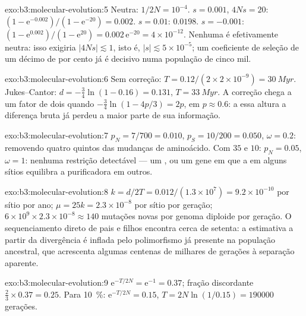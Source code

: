 \begin{solution}{exo:b3:molecular-evolution:5}
Neutra: $1/2N = 10^{-4}$. $s = 0.001$, $4Ns = 20$: $(1 - \mathrm{e}^{-0.002})/
(1 - \mathrm{e}^{-20}) = 0.002$. $s = 0.01$:
$0.0198$. $s = -0.001$: $(1 -
\mathrm{e}^{0.002})/(1 - \mathrm{e}^{20}) = 0.002\,\mathrm{e}^{-20} =
4\times 10^{-12}$. Nenhuma é efetivamente
neutra: isso exigiria $|4Ns|
\lesssim 1$, isto é, $|s| \lesssim 5\times 10^{-5}$; um coeficiente de seleção de um décimo de por cento já é
decisivo numa população de cinco mil.
\end{solution}

\begin{solution}{exo:b3:molecular-evolution:6}
Sem correção: $T = 0.12/(2\times 2\times 10^{-9}) = \qty{30}{Myr}$.
Jukes--Cantor: $d = -\tfrac{3}{4}\ln(1 - 0.16) = 0.131$, $T =
\qty{33}{Myr}$. A correção chega a um fator de dois quando
$-\tfrac{3}{4}
\ln(1 - 4p/3) = 2p$, em $p \approx 0.6$: a essa altura a
diferença bruta já perdeu a maior parte de sua informação.
\end{solution}

\begin{solution}{exo:b3:molecular-evolution:7}
$p_{N} = 7/700 = 0.010$, $p_{S} = 10/200 = 0.050$, $\omega = 0.2$:
 removendo quatro quintos das mudanças de aminoácido.
Com $35$ e $10$: $p_{N} = 0.05$, $\omega = 1$: nenhuma restrição
detectável --- um , ou um gene em que a  em
alguns sítios equilibra a purificadora em outros.
\end{solution}

\begin{solution}{exo:b3:molecular-evolution:8}
$k = d/2T = 0.012/(1.3\times 10^{7}) = 9.2\times 10^{-10}$ por sítio por
ano; $\mu = 25k = 2.3\times 10^{-8}$ por sítio por geração; $6\times
10^{9}\times 2.3\times 10^{-8} \approx 140$ mutações novas por genoma
diploide por geração. O sequenciamento direto de pais e filhos encontra
cerca de setenta: a estimativa a partir da divergência é inflada pelo
polimorfismo já presente na população ancestral, que acrescenta algumas
centenas de milhares de gerações à separação aparente.
\end{solution}

\begin{solution}{exo:b3:molecular-evolution:9}
$\mathrm{e}^{-T/2N} = \mathrm{e}^{-1} = 0.37$; fração discordante
$\tfrac{2}{3}
\times 0.37 = 0.25$. Para \qty{10}{\%}:
$\mathrm{e}^{-T/2N} = 0.15$, $T =
2N\ln(1/0.15) = \num{190000}$ gerações.
\end{solution}

